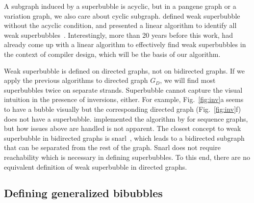 \documentclass[webpdf,contemporary,large,namedate]{oup-authoring-template}%
\begin{document}
A subgraph induced by a superbubble is acyclic, but in a pangene graph or a variation graph,
we also care about cyclic subgraph.
\citet{Gartner:2018aa} defined weak superbubble without the acyclic condition,
and presented a linear algorithm to identify all weak superbubbles~\citep{DBLP:journals/algorithms/GartnerS19}.
Interestingly, more than 20 years before this work,
\citet{DBLP:conf/pldi/JohnsonPP94} had already come up with a linear algorithm to effectively find weak superbubbles in the context of compiler design,
which will be the basis of our algorithm.

Weak superbubble is defined on directed graphs, not on bidirected graphs.
If we apply the previous algorithms to directed graph $G_D$,
we will find most superbubbles twice on separate strands.
Superbubble cannot capture the visual intuition in the presence of inversions, either.
For example, Fig.~\ref{fig:inv}a seems to have a bubble visually
but the corresponding directed graph (Fig.~\ref{fig:inv}f) does not have a superbubble.
\citet{Dabbaghie:2022aa} implemented the algorithm by \citet{DBLP:conf/wabi/OnoderaSS13} for sequence graphs,
but how issues above are handled is not apparent.
The closest concept to weak superbubble in bidirected graphs is snarl~\citep{Paten:2018aa},
which leads to a bidirected subgraph that can be separated from the rest of the graph.
Snarl does not require reachability which is necessary in defining superbubbles.
To this end, there are no equivalent definition of weak superbubble in directed graphs.

\subsection{Defining generalized bibubbles}

\end{document}
